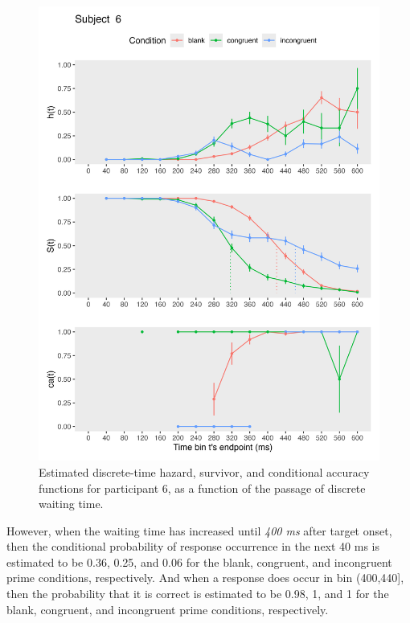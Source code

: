 \documentclass[
  man,floatsintext]{apa6}
\begin{document}
\begin{figure}[H]

{\centering \includegraphics[width=12in,height=0.67\textheight,]{../Tutorial_1_descriptive_stats/figures/Plot_for_subject6_PanisSchmidt} 

}

\caption{Estimated discrete-time hazard, survivor, and conditional accuracy functions for participant 6, as a function of the passage of discrete waiting time.}\label{fig:eha-plot}
\end{figure}

However, when the waiting time has increased until \emph{400 ms} after target onset, then the conditional probability of response occurrence in the next 40 ms is estimated to be 0.36, 0.25, and 0.06 for the blank, congruent, and incongruent prime conditions, respectively. And when a response does occur in bin (400,440{]}, then the probability that it is correct is estimated to be 0.98, 1, and 1 for the blank, congruent, and incongruent prime conditions, respectively.
\end{document}
